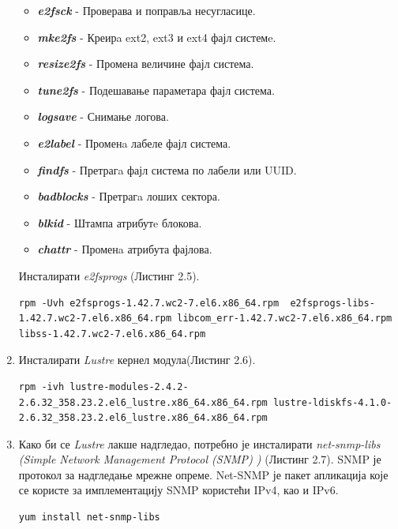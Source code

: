 \begin{enumerate}
\begin{itemize}
\item \textbf{\textit{e2fsck}} - Проверава и поправља несугласице.
\item \textbf{\textit{mke2fs}} - Креирa ext2, ext3 и ext4 фајл системe.
\item \textbf{\textit{resize2fs}} - Промена величине фајл система.
\item \textbf{\textit{tune2fs}} - Подешавање параметара фајл система.
\item \textbf{\textit{logsave}} - Снимање логова.
\item \textbf{\textit{e2label}} - Променa лабеле фајл система.
\item \textbf{\textit{findfs}} - Претрагa фајл система по лабели или UUID.
\item \textbf{\textit{badblocks}} - Претрагa лоших сектора.
\item \textbf{\textit{blkid}} - Штампа атрибутe блокова.
\item \textbf{\textit{chattr}}  - Променa атрибута фајлова.
\end{itemize}

Инсталирати \textit{e2fsprogs} (Листинг 2.5).

\begin{lstlisting}[style=nonumbers,frame=single,caption=Инсталација \textit{e2fsprogs}]
rpm -Uvh e2fsprogs-1.42.7.wc2-7.el6.x86_64.rpm  e2fsprogs-libs-1.42.7.wc2-7.el6.x86_64.rpm libcom_err-1.42.7.wc2-7.el6.x86_64.rpm libss-1.42.7.wc2-7.el6.x86_64.rpm 
\end{lstlisting}

\item  Инсталирати   \textit{Lustre} кернел модула(Листинг 2.6).

\begin{lstlisting}[style=nonumbers,frame=single,caption=Инсталација кернел модула]
rpm -ivh lustre-modules-2.4.2-2.6.32_358.23.2.el6_lustre.x86_64.x86_64.rpm lustre-ldiskfs-4.1.0-2.6.32_358.23.2.el6_lustre.x86_64.x86_64.rpm
\end{lstlisting}

\item Како би се   \textit{Lustre} лакше надгледао, потребно је инсталирати \textit{net-snmp-libs (Simple Network Management Protocol (\gls{SNMP}) )} (Листинг 2.7). SNMP је протокол за надгледање мрежне опреме. Net-SNMP је пакет апликација које се користе за имплементацију SNMP користећи IPv4, као и IPv6.

\begin{lstlisting}[style=nonumbers,frame=single,caption= Инсталација Net-SNMP-а]
yum install net-snmp-libs


\end{lstlisting}
\end{enumerate}

